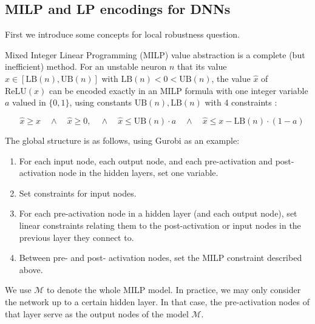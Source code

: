 \documentclass{llncs}
\newcommand{\UB}{\mathrm{UB}}
\newcommand{\LB}{\mathrm{LB}}
\newcommand{\ReLU}{\mathrm{ReLU}}
\begin{document}
	
	
	\subsection{MILP and LP encodings for DNNs}
	
	First we introduce some concepts for local robustness question.
	
	Mixed Integer Linear Programming (MILP) value abstraction is a complete (but inefficient) method. 
	For an unstable neuron $n$ that its value $x \in [\LB(n),\UB(n)]$ with $\LB(n)<0<\UB(n)$, the value $\hat{x}$ of $\ReLU(x)$ can be encoded exactly in an MILP formula with one 
	integer variable $a$ valued in $\{0,1\}$, using constants $\UB(n),\LB(n)$ with 4 constraints \cite{MILP}:
	
	\vspace{-0.4cm}
	\begin{equation}\quad \hat{x} \geq x \quad \wedge \quad \hat{x} \geq 0, \quad \wedge \quad \hat{x} \leq \UB(n) \cdot a \quad \wedge \quad \hat{x} \leq x-\LB(n) \cdot (1-a)
		\label{eq11}
	\end{equation}
	
	
	The global structure is as follows, using Gurobi as an example:
	\begin{enumerate}
		\item For each input node, each output node, and each pre-activation and post-activation node in the hidden layers,  set one variable. 
		\item Set constraints for input nodes.
		\item For each pre-activation node in a hidden layer (and each output node), set linear constraints relating them to the post-activation or input nodes in the previous layer they connect to.
		\item Between pre- and post- activation nodes, set the MILP constraint described above.
	\end{enumerate} We use $\mathcal{M}$ to denote the whole MILP model. In practice, we may only consider the network up to a certain hidden layer. In that case, the pre-activation nodes of that layer serve as the output nodes of the model $\mathcal{M}$.
	
\end{document}
